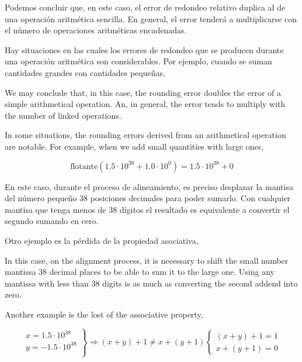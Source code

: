 \begin{paracol}{2}
Podemos concluir que, en este caso, el error de redondeo relativo duplica al de una operación aritmética sencilla. En general, el error tenderá a multiplicarse con el número de operaciones aritméticas encadenadas.

Hay situaciones en las cuales los errores de redondeo que se producen durante una operación aritmética son considerables. Por ejemplo, cuando se suman cantidades grandes con cantidades pequeñas,

\switchcolumn
We may conclude that, in this case, the rounding error doubles the error of a simple arithmetical operation. An, in general, the error tends to multiply with the number of linked operations.

In some situations, the rounding errors derived from an arithmetical operation are notable. For example, when we add small quantities with large ones,
\end{paracol}
\begin{equation*}
\text{flotante}(1.5\cdot10^{38}+1.0\cdot10^0)=1.5\cdot10^{38} + 0
\end{equation*}
\begin{paracol}{2}
En este caso, durante el proceso de alineamiento, es preciso desplazar la mantisa del número pequeño 38 posiciones decimales para poder sumarlo. Con cualquier mantisa que tenga menos de 38 dígitos el resultado es equivalente a convertir el segundo sumando en cero.

Otro ejemplo es la pérdida de la propiedad asociativa,

\switchcolumn
In this case, on the alignment process, it is necessary to shift the small number mantissa 38 decimal places to be able to sum it to the large one. Using any mantissa with less than 38 digits is as much as converting the second addend into zero.

Another example is the lost of the associative property,
\end{paracol}
\begin{equation*}
\left. \begin{aligned}
x=1.5\cdot10^{38}\\
y=-1.5\cdot10^{38}\\
\end{aligned}
\right\}
\Rightarrow
(x+y)+1\neq x+(y+1)
\begin{cases}
(x+y)+1=1\\
x+(y+1)=0
\end{cases}
\end{equation*}
